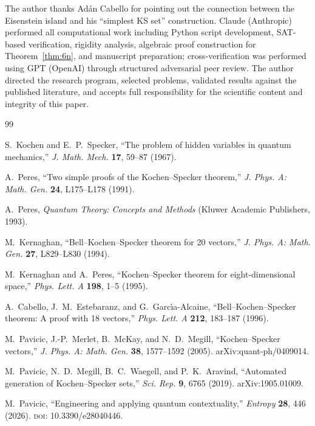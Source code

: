 \documentclass[12pt,a4paper]{article}
\begin{document}
The author thanks Ad\'an Cabello for pointing out the connection between the Eisenstein island and his ``simplest KS set'' construction.  Claude (Anthropic) performed all computational work including Python script development, SAT-based verification, rigidity analysis, algebraic proof construction for Theorem~\ref{thm:6n}, and manuscript preparation; cross-verification was performed using GPT (OpenAI) through structured adversarial peer review.  The author directed the research program, selected problems, validated results against the published literature, and accepts full responsibility for the scientific content and integrity of this paper.

\begin{thebibliography}{99}

S.~Kochen and E.~P.~Specker,
``The problem of hidden variables in quantum mechanics,''
\textit{J. Math. Mech.} \textbf{17}, 59--87 (1967).

A.~Peres,
``Two simple proofs of the Kochen--Specker theorem,''
\textit{J. Phys. A: Math. Gen.} \textbf{24}, L175--L178 (1991).

A.~Peres,
\textit{Quantum Theory: Concepts and Methods}
(Kluwer Academic Publishers, 1993).

M.~Kernaghan,
``Bell--Kochen--Specker theorem for 20 vectors,''
\textit{J. Phys. A: Math. Gen.} \textbf{27}, L829--L830 (1994).

M.~Kernaghan and A.~Peres,
``Kochen--Specker theorem for eight-dimensional space,''
\textit{Phys. Lett. A} \textbf{198}, 1--5 (1995).

A.~Cabello, J.~M.~Estebaranz, and G.~Garc\'{\i}a-Alcaine,
``Bell--Kochen--Specker theorem: A proof with 18 vectors,''
\textit{Phys. Lett. A} \textbf{212}, 183--187 (1996).

M.~Pavicic, J.-P.~Merlet, B.~McKay, and N.~D.~Megill,
``Kochen--Specker vectors,''
\textit{J. Phys. A: Math. Gen.} \textbf{38}, 1577--1592 (2005).
arXiv:quant-ph/0409014.

M.~Pavicic, N.~D.~Megill, B.~C.~Waegell, and P.~K.~Aravind,
``Automated generation of Kochen--Specker sets,''
\textit{Sci. Rep.} \textbf{9}, 6765 (2019).
arXiv:1905.01009.

M.~Pavicic,
``Engineering and applying quantum contextuality,''
\textit{Entropy} \textbf{28}, 446 (2026).
\textsc{doi}: 10.3390/e28040446.


\end{thebibliography}
\end{document}
